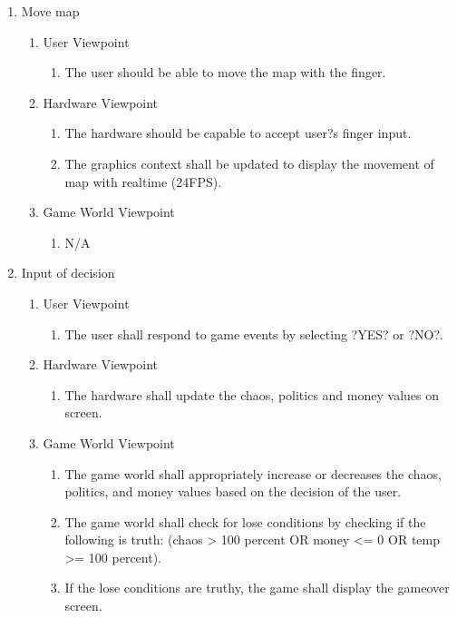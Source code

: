 \documentclass[]{article}
\begin{document}
\begin{enumerate}[{BE}1.]
\begin{enumerate}[{VP5}.1]
\begin{enumerate}
			\end{enumerate}			
	\end{enumerate}
	\item Move map
		\begin{enumerate}[{VP6}.1]
			\item User Viewpoint
			\begin{enumerate}
				\item The user should be able to move the map with the finger.
			\end{enumerate}
		\item Hardware Viewpoint
			\begin{enumerate}
				\item The hardware should be capable to accept user?s finger input.
				\item The graphics context shall be updated to display the movement of map with realtime (24FPS).
			\end{enumerate}
		\item Game World Viewpoint
			\begin{enumerate}
				\item N/A
			\end{enumerate}			
	\end{enumerate}
		\item Input of decision
	\begin{enumerate}[{VP7}.1]
		\item User Viewpoint
			\begin{enumerate}
				\item The user shall respond to game events by selecting ?YES? or ?NO?.
			\end{enumerate}
		\item Hardware Viewpoint
			\begin{enumerate}
				\item The hardware shall update the chaos, politics and money values on screen.
			\end{enumerate}
		\item Game World Viewpoint
			\begin{enumerate}
				\item The game world shall appropriately increase or decreases the chaos, politics, and money values based on the decision of the user.
				\item  The game world shall check for lose conditions by checking if the following is truth: (chaos > 100 percent OR money <= 0 OR temp >= 100 percent).
				\item If the lose conditions are truthy, the game shall display the gameover screen.


\end{enumerate}
\end{enumerate}
\end{enumerate}
\end{document}
